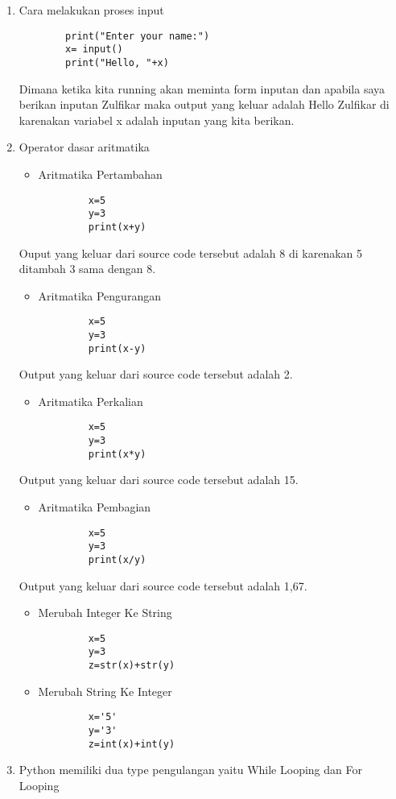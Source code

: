 \begin{enumerate}
\begin{enumerate}
\par
\item Cara melakukan proses input
	\begin{verbatim}
		print("Enter your name:")
		x= input()
		print("Hello, "+x)
	\end{verbatim}
\subitem Dimana ketika kita running akan meminta form inputan dan apabila saya berikan inputan Zulfikar maka output yang keluar adalah Hello Zulfikar di karenakan variabel x adalah inputan yang kita berikan.
\par
\item Operator dasar aritmatika
 	\begin{itemize}
	\item Aritmatika Pertambahan
	\end{itemize}
		\begin{verbatim}
			x=5
			y=3
			print(x+y)
		\end{verbatim}
	\subitem Ouput yang keluar dari source code tersebut adalah 8 di karenakan 5 ditambah 3 sama dengan 8.
	\begin{itemize}
	\item Aritmatika Pengurangan
	\end{itemize}	
		\begin{verbatim}
			x=5
			y=3
			print(x-y)
		\end{verbatim}
	\subitem Output yang keluar dari source code tersebut adalah 2.
	\begin{itemize}
	\item Aritmatika Perkalian
	\end{itemize}
		\begin{verbatim}
			x=5
			y=3
			print(x*y)
		\end{verbatim}
	\subitem Output yang keluar dari source code tersebut adalah 15.
	\begin{itemize}
	\item Aritmatika Pembagian
	\end{itemize}
		\begin{verbatim}
			x=5
			y=3
			print(x/y)
		\end{verbatim}
	\subitem Output yang keluar dari source code tersebut adalah 1,67.
	\begin{itemize}
	\item Merubah Integer Ke String
	\end{itemize}
		\begin{verbatim}
			x=5
			y=3
			z=str(x)+str(y)
		\end{verbatim}
	\begin{itemize}
	\item Merubah String Ke Integer
	\end{itemize}
		\begin{verbatim}
			x='5'
			y='3'
			z=int(x)+int(y)
		\end{verbatim}
\par
\item Python memiliki dua type pengulangan yaitu While Looping dan For Looping


\end{enumerate}
\end{enumerate}
